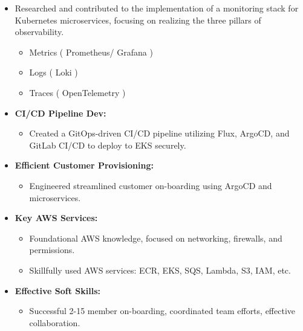 \documentclass[10pt,a4paper]{altacv}
\begin{document}
\begin{itemize}
  \begin{itemize}
    \item Researched and contributed to the implementation of a monitoring stack for Kubernetes microservices, focusing on realizing the three pillars of observability.
    \begin{itemize}
        \item Metrics ( Prometheus/ Grafana )
        \item Logs ( Loki )
        \item Traces ( OpenTelemetry )
  \end{itemize}
\item \textbf{CI/CD Pipeline Dev:}
  \begin{itemize}
    \item Created a GitOps-driven CI/CD pipeline utilizing Flux, ArgoCD, and GitLab CI/CD to deploy to EKS securely. 
  \end{itemize}
\item \textbf{Efficient Customer Provisioning:}
  \begin{itemize}
    \item Engineered streamlined customer on-boarding using ArgoCD and microservices.
  \end{itemize}
\item \textbf{Key AWS Services:}
  \begin{itemize}
  \item Foundational AWS knowledge, focused on networking, firewalls, and permissions.
    \item Skillfully used AWS services: ECR, EKS, SQS, Lambda, S3, IAM, etc.
  \end{itemize}
\item \textbf{Effective Soft Skills:}
  \begin{itemize}
    \item Successful 2-15 member on-boarding, coordinated team efforts, effective collaboration.
  \end{itemize}
  \end{itemize}
\end{itemize}
\end{document}
